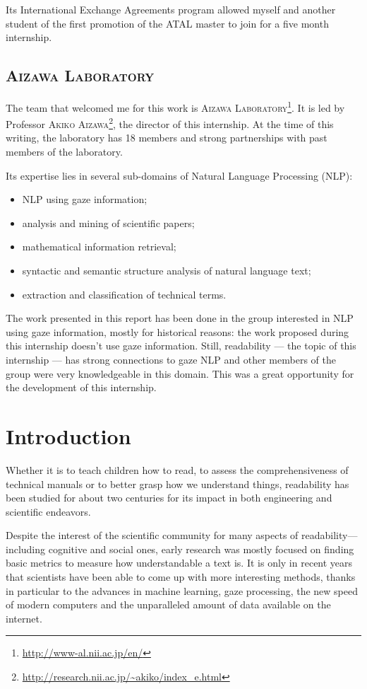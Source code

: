 \documentclass[a4paper, 11pt, onepage]{scrreprt}
\begin{document}
Its International Exchange Agreements program allowed myself and
another student of the first promotion of the ATAL master to join for
a five month internship.

\section{\textsc{Aizawa Laboratory}}
\label{sec:aizawa-laboratory}

The team that welcomed me for this work is \textsc{Aizawa
  Laboratory}\footnote{\url{http://www-al.nii.ac.jp/en/}}. It is led
by Professor \textsc{Akiko
  Aizawa}\footnote{\url{http://research.nii.ac.jp/~akiko/index_e.html}},
the director of this internship. At the time of this writing, the
laboratory has 18 members and strong partnerships with past members of
the laboratory.

Its expertise lies in several sub-domains of Natural Language
Processing (NLP):
\begin{itemize}
\item NLP using gaze information;
\item analysis and mining of scientific papers;
\item mathematical information retrieval;
\item syntactic and semantic structure analysis of natural language
  text;
\item extraction and classification of technical terms.
\end{itemize}

The work presented in this report has been done in the group
interested in NLP using gaze information, mostly for historical
reasons: the work proposed during this internship doesn't use gaze
information. Still, readability — the topic of this internship — has
strong connections to gaze NLP and other members of the group were
very knowledgeable in this domain. This was a great opportunity for
the development of this internship.

\chapter{Introduction}

Whether it is to teach children how to read, to assess the
comprehensiveness of technical manuals or to better grasp how we
understand things, readability has been studied for about two
centuries for its impact in both engineering and scientific endeavors.

Despite the interest of the scientific community for many aspects of
readability—including cognitive and social ones, early research was
mostly focused on finding basic metrics to measure how understandable
a text is. It is only in recent years that scientists have been able
to come up with more interesting methods, thanks in particular to the
advances in machine learning, gaze processing, the new speed of modern
computers and the unparalleled amount of data available on the
internet.
\end{document}
